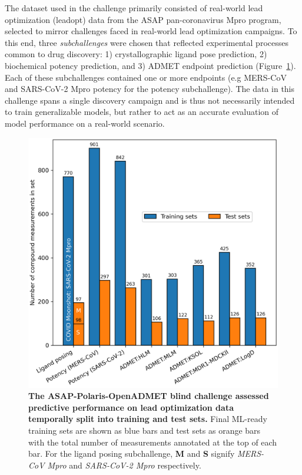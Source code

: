 \documentclass[journal=jcim,manuscript=article]{achemso}
\begin{document}
The dataset used in the challenge primarily consisted of real-world lead optimization (leadopt) data from the ASAP pan-coronavirus Mpro program, selected to mirror challenges faced in real-world lead optimization campaigns. To this end, three \textit{subchallenges} were chosen that reflected experimental processes common to drug discovery: 1) crystallographic ligand pose prediction, 2) biochemical potency prediction, and 3) ADMET endpoint prediction (Figure~\ref{fgr:datasets_overview}). Each of these subchallenges contained one or more endpoints (e.g MERS-CoV and SARS-CoV-2 Mpro potency for the potency subchallenge). The data in this challenge spans a single discovery campaign and is thus not necessarily intended to train generalizable models, but rather to act as an accurate evaluation of model performance on a real-world scenario.

\begin{figure}
    \includegraphics[scale=0.5]{fig1_dataset_splits/reproduce_figure/datasets_overview.png}
  \caption{\textbf{The ASAP-Polaris-OpenADMET blind challenge assessed predictive performance on lead optimization data temporally split into training and test sets.} 
  Final ML-ready training sets are shown as blue bars and test sets as orange bars with the total number of measurements annotated at the top of each bar. For the ligand posing subchallenge, \textbf{M} and \textbf{S} signify \textit{MERS-CoV Mpro} and \textit{SARS-CoV-2 Mpro} respectively. }
  \label{fgr:datasets_overview}
\end{figure}
\end{document}
